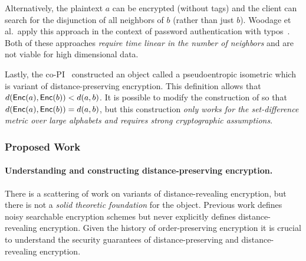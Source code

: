 \iffalse
The approach can be summarized as follows:
\begin{enumerate}\setlength\itemsep{0em}
\item The clients appends to $\enc(a)$ a deterministic encryption of all $b$ such that $d(a,b) \le 1$.
\item To search, the client deterministically encrypts their search term $b$.
\item The server returns all ciphertexts where some encryption matches.\footnote{Some  modifications are necessary to meet ideal security such as hiding the number of neighbors.  See the prior work of Boldyreva and Chenette~\cite{boldyreva2014efficient}.}  
\end{enumerate}
\fi

Alternatively, the plaintext $a$ can be encrypted (without tags) and the client can search for the disjunction of all neighbors of $b$ (rather than just $b$).  Woodage et al.~apply this approach in the context of password authentication with typos~\cite{C:WCDJR17}.  Both of these approaches {\em require time linear in the number of neighbors} and are not viable for high dimensional data.

Lastly, the co-PI~\cite{EPRINT:ABCFG16} constructed an object called a
pseudoentropic isometric which is variant of distance-preserving
encryption.  This definition allows that
$d(\mathsf{Enc}(a), \mathsf{Enc}(b)) <d(a,b)$. It is possible to modify the
construction of \cite{EPRINT:ABCFG16} so that $d(\mathsf{Enc}(a), \mathsf{Enc}(b)) =
d(a,b)$, but this construction {\em only works for the set-difference
metric over large alphabets and requires strong cryptographic assumptions}.

\subsubsection{Proposed Work}

\paragraph{Understanding and constructing distance-preserving encryption.}
There is a scattering of work on variants of distance-revealing
encryption, but there is not a {\em solid theoretic foundation} for the
object.  Previous work defines noisy searchable encryption schemes but
never explicitly defines distance-revealing encryption.   Given the history of order-preserving encryption it is crucial to understand the security guarantees of distance-preserving and distance-revealing encryption. %

